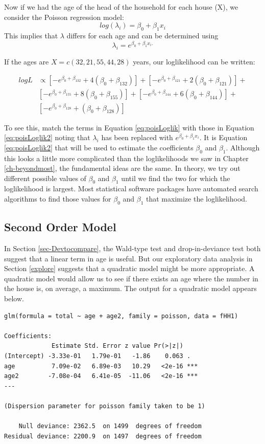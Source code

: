 \documentclass[
]{krantz}
\begin{document}
Now if we had the age of the head of the household for each house (X), we consider the Poisson regression model:
\[
log(\lambda_i)=\beta_0+\beta_1x_i
 \]
This implies that \(\lambda\) differs for each age and can be determined using
\[\lambda_i=e^{\beta_0+\beta_1x_i.}\]

If the ages are \(X=c(32,21,55,44,28)\) years, our loglikelihood can be written:

\begin{align}
 logL & \propto [-e^{\beta_0+\beta_132}+4({\beta_0+\beta_132})]+
[-e^{\beta_0+\beta_121}+2({\beta_0+\beta_121})]+ \nonumber \\ 
&  [-e^{\beta_0+\beta_155}+8({\beta_0+\beta_155})]+
[-e^{\beta_0+\beta_144}+6({\beta_0+\beta_144})]+ \nonumber \\
  &  [-e^{\beta_0+\beta_128}+({\beta_0+\beta_128})]
\label{eq:poisLoglik2}
\end{align}

To see this, match the terms in Equation \eqref{eq:poisLoglik} with those in Equation \eqref{eq:poisLoglik2} noting that \(\lambda_i\) has been replaced with \(e^{\beta_0+\beta_1x_i}\). It is Equation \eqref{eq:poisLoglik2} that will be used to estimate the coefficients \(\beta_0\) and \(\beta_1\). Although this looks a little more complicated than the loglikelihoods we saw in Chapter \ref{ch-beyondmost}, the fundamental ideas are the same. In theory, we try out different possible values of \(\beta_0\) and \(\beta_1\) until we find the two for which the loglikelihood is largest. Most statistical software packages have automated search algorithms to find those values for \(\beta_0\) and \(\beta_1\) that maximize the loglikelihood.

\hypertarget{second-order-model}{%
\subsection{Second Order Model}\label{second-order-model}}

In Section \ref{sec-Devtocompare}, the Wald-type test and drop-in-deviance test both suggest that a linear term in age is useful. But our exploratory data analysis in Section \ref{explore} suggests that a quadratic model might be more appropriate. A quadratic model would allow us to see if there exists an age where the number in the house is, on average, a maximum. The output for a quadratic model appears below.

\begin{verbatim}
glm(formula = total ~ age + age2, family = poisson, data = fHH1)

Coefficients:
             Estimate Std. Error z value Pr(>|z|)    
(Intercept) -3.33e-01   1.79e-01   -1.86    0.063 .  
age          7.09e-02   6.89e-03   10.29   <2e-16 ***
age2        -7.08e-04   6.41e-05  -11.06   <2e-16 ***
---

(Dispersion parameter for poisson family taken to be 1)

    Null deviance: 2362.5  on 1499  degrees of freedom
Residual deviance: 2200.9  on 1497  degrees of freedom
\end{verbatim}
\end{document}
